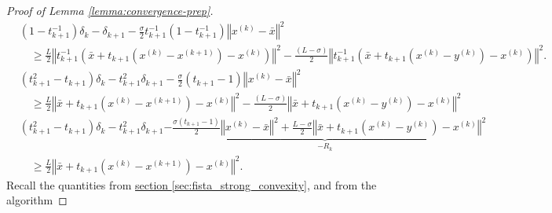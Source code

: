 \begin{proof}[Proof of Lemma \ref*{lemma:convergence-prep}]
        \begin{align}
            & (1-t_{k + 1}^{-1})\delta_k  - \delta_{k + 1} 
            -
            \frac{\sigma}{2}t^{-1}_{k + 1}\left(1 - t^{-1}_{k + 1}\right)
            \left\Vert 
                x^{(k)} - \bar x
            \right\Vert^2 
            \nonumber
            \\
            &\quad\ge \frac{L}{2} \left\Vert
               t^{-1}_{k + 1}\left(
                \bar x + t_{k + 1} \left(
                    x^{(k)} - x^{(k + 1)}
                \right) - x^{(k)}
                \right)
            \right\Vert^2 - 
            \frac{(L - \sigma)}{2}
            \left\Vert
                t^{-1}_{k + 1}\left(
                    \bar x + t_{k + 1} \left(
                        x^{(k)} - y^{(k)}
                    \right) - x^{(k)}
                \right)
            \right\Vert^2. 
            \nonumber
            \\
            & (t_{k + 1}^2 - t_{k + 1})\delta_k - t_{k + 1}^2\delta_{k + 1}
            - \frac{\sigma}{2}(t_{k + 1} - 1)
            \left\Vert
                x^{(k)} - \bar x
            \right\Vert^2 
            \nonumber
            \\
            &\quad\ge 
            \frac{L}{2} \left\Vert
                \bar x + t_{k + 1} \left(
                    x^{(k)} - x^{(k + 1)}
                \right) - x^{(k)}
            \right\Vert^2 - 
            \frac{(L - \sigma)}{2}
            \left\Vert
                \bar x + t_{k + 1} \left(
                    x^{(k)} - y^{(k)}
                \right) - x^{(k)}
            \right\Vert^2
            \nonumber
            \\
            & 
            (t_{k + 1}^2 - t_{k + 1})\delta_k - t_{k + 1}^2\delta_{k + 1} 
            \underbrace{
                - 
                \frac{\sigma(t_{k + 1} - 1)}{2}
                \left\Vert
                    x^{(k)} - \bar x
                \right\Vert^2 
                + 
                \frac{L - \sigma}{2}
                \left\Vert
                    \bar x + t_{k + 1}\left( x^{(k)} - y^{(k)}\right) - x^{(k)}
                \right\Vert^2
            }_{-R_k}
            \nonumber
            \\
            &\quad \ge 
            \frac{L}{2}\left\Vert 
                \bar x + t_{k + 1}
                \left(x^{(k)} - x^{(k + 1)}\right) - x^{(k)}
            \right\Vert^2. 
            \label{eqn:full_pg}
        \end{align}
        Recall the quantities from \hyperref[sec:fista_strong_convexity]{section \ref*{sec:fista_strong_convexity}}, and from the algorithm

\end{proof}
